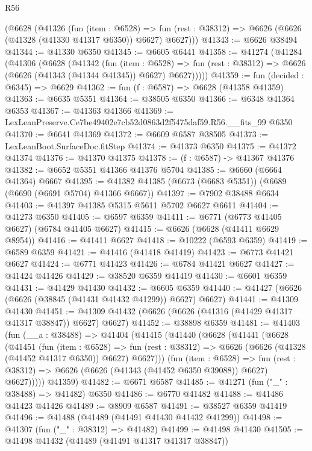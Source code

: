 \begin{lexlean}{R56}
\begin{coremodule}
    (@6628
      (@41326
        (fun (item : @6528) =>
        fun (rest : @38312) => @6626 (@6626 (@41328 (@41330 @41317 @6350)) @6627) @6627)))
@41343 := @6626 @38494
@41344 := @41330 @6350
@41345 := @6605 @6441
@41358 := @41274
    (@41284
      (@41306
        (@6628
          (@41342
            (fun (item : @6528) =>
            fun (rest : @38312) => @6626 (@6626 (@41343 (@41344 @41345)) @6627) @6627)))))
@41359 := fun (decided : @6345) => @6629
@41362 := fun (f : @6587) => @6628 (@41358 @41359)
@41363 := @6635 @5351
@41364 := @38505 @6350
@41366 := @6348 @41364 @6353
@41367 := @41363 @41366
@41369 := LexLeanPreserve.Ce7be49402e7cb52d0863d2f5475daf59.R56.__fits_99 @6350
@41370 := @6641 @41369
@41372 := @6609 @6587 @38505
@41373 := LexLeanBoot.SurfaceDoc.fitStep
@41374 := @41373 @6350
@41375 := @41372 @41374
@41376 := @41370 @41375
@41378 := (f : @6587) -> @41367 @41376
@41382 := @6652 @5351 @41366 @41376 @5704
@41385 := @6660 (@6664 @41364) @6667
@41395 := @41382 @41385 (@6673 (@6683 @5351)) (@6689 (@6690 (@6691 @5704) @41366 @6667))
@41397 := @7902 @38488 @6634
@41403 := @41397 @41385 @5315 @5611 @5702 @6627 @6611
@41404 := @41273 @6350
@41405 := @6597 @6359
@41411 := @6771 (@6773 @41405 @6627) (@6784 @41405 @6627)
@41415 := @6626 (@6628 (@41411 @6629 @8954))
@41416 := @41411 @6627
@41418 := @10222 (@6593 @6359)
@41419 := @6589 @6359
@41421 := @41416 (@41418 @41419)
@41423 := @6773 @41421 @6627
@41424 := @6771 @41423
@41426 := @6784 @41421 @6627
@41427 := @41424 @41426
@41429 := @38520 @6359 @41419
@41430 := @6601 @6359
@41431 := @41429 @41430
@41432 := @6605 @6359
@41440 := @41427 (@6626 (@6626 (@38845 (@41431 @41432 @41299)) @6627) @6627)
@41441 := @41309 @41430
@41451 := @41309 @41432 (@6626 (@6626 (@41316 (@41429 @41317 @41317 @38847)) @6627) @6627)
@41452 := @38898 @6359
@41481 := @41403
    (fun (__a : @38488) =>
    @41404
      (@41415
        (@41440
          (@6628
            (@41441
              (@6628
                (@41451
                  (fun (item : @6528) =>
                  fun (rest : @38312) => @6626 (@6626 (@41328 (@41452 @41317 @6350)) @6627) @6627)))
              (fun (item : @6528) =>
              fun (rest : @38312) => @6626 (@6626 (@41343 (@41452 @6350 @39088)) @6627) @6627)))))
      @41359)
@41482 := @6671 @6587
@41485 := @41271 (fun ("_" : @38488) => @41482) @6350
@41486 := @6770 @41482
@41488 := @41486 @41423 @41426
@41489 := @8909 @6587
@41491 := @38527 @6359 @41419
@41496 := @41488 (@41489 (@41491 @41430 @41432 @41299))
@41498 := @41307 (fun ("_" : @38312) => @41482)
@41499 := @41498 @41430
@41505 := @41498 @41432 (@41489 (@41491 @41317 @41317 @38847))

\end{coremodule}
\end{lexlean}
